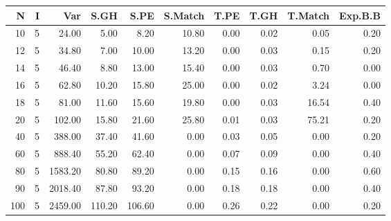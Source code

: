 \documentclass[twoside,a4paper,openright,12pt]{book}
\begin{document}
\begin{table}[ht]
\centering
\begin{tabular}{rrrrrrrrrr}
  \hline
N & I & Var & S.GH & S.PE & S.Match & T.PE & T.GH & T.Match & Exp.B.B \\ 
  \hline 10 &   5 & 24.00 & 5.00 & 8.20 & 10.80 & 0.00 & 0.02 & 0.05 & 0.20 \\ 
   12 &   5 & 34.80 & 7.00 & 10.00 & 13.20 & 0.00 & 0.03 & 0.15 & 0.20 \\ 
   14 &   5 & 46.40 & 8.80 & 13.00 & 15.40 & 0.00 & 0.03 & 0.70 & 0.00 \\ 
   16 &   5 & 62.80 & 10.20 & 15.80 & 25.00 & 0.00 & 0.02 & 3.24 & 0.00 \\ 
   18 &   5 & 81.00 & 11.60 & 15.60 & 19.80 & 0.00 & 0.03 & 16.54 & 0.40 \\ 
   20 &   5 & 102.00 & 15.80 & 21.60 & 25.80 & 0.01 & 0.03 & 75.21 & 0.20 \\ 
   40 &   5 & 388.00 & 37.40 & 41.60 & 0.00 & 0.03 & 0.05 & 0.00 & 0.20 \\ 
   60 &   5 & 888.40 & 55.20 & 62.40 & 0.00 & 0.07 & 0.09 & 0.00 & 0.40 \\ 
   80 &   5 & 1583.20 & 80.80 & 89.20 & 0.00 & 0.15 & 0.16 & 0.00 & 0.60 \\ 
   90 &   5 & 2018.40 & 87.80 & 93.20 & 0.00 & 0.18 & 0.18 & 0.00 & 0.40 \\ 
  100 &   5 & 2459.00 & 110.20 & 106.60 & 0.00 & 0.26 & 0.22 & 0.00 & 0.20 \\
  \hline
 \end{tabular}
 \end{table}
 \newpage
\end{document}
